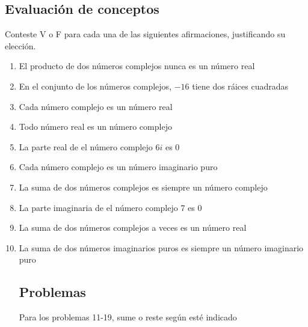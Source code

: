 \documentclass[letterpaper]{article}
\begin{document}
\begin{multicols}{2}
  \subsection{Evaluación de conceptos}
  Conteste V o F para cada una de las siguientes afirmaciones, justificando su elección.
  \begin{enumerate}
    \item El producto de dos números complejos nunca es un número real
    \item En el conjunto de los números complejos, $ -16 $ tiene dos ráices cuadradas 
    \item Cada número complejo es un número real
    \item Todo número real es un número complejo
    \item La parte real de el número complejo $ 6i $ es $ 0 $
    \item Cada número complejo es un número imaginario puro
    \item La suma de dos números complejos es siempre un número complejo
    \item La parte imaginaria de el número complejo 7 es 0
    \item La suma de dos números complejos a veces es un número real
    \item La suma de dos números imaginarios puros es siempre un número imaginario puro\\
    \subsection{Problemas}
    Para los problemas 11-19, sume o reste según esté indicado
    

\end{enumerate}
\end{multicols}
\end{document}
